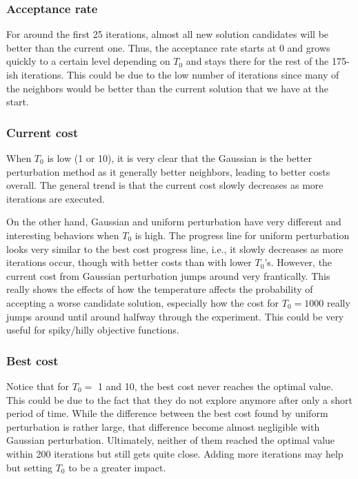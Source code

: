 \subsubsection*{Acceptance rate}

For around the first 25 iterations, almost all new solution candidates will be better than the current one. Thus, the acceptance rate starts at 0 and grows quickly to a certain level depending on \(T_0\) and stays there for the rest of the 175-ish iterations. This could be due to the low number of iterations since many of the neighbors would be better than the current solution that we have at the start.

\subsubsection*{Current cost}

When \(T_0\) is low (1 or 10), it is very clear that the Gaussian is the better perturbation method as it generally better neighbors, leading to better costs overall. The general trend is that the current cost slowly decreases as more iterations are executed.

On the other hand, Gaussian and uniform perturbation have very different and interesting behaviors when \(T_0\) is high. The progress line for uniform perturbation looks very similar to the best cost progress line, i.e., it slowly decreases as more iterations occur, though with better costs than with lower \(T_0\)'s. However, the current cost from Gaussian perturbation jumps around very frantically. This really shows the effects of how the temperature affects the probability of accepting a worse candidate solution, especially how the cost for \(T_0=1000\) really jumps around until around halfway through the experiment. This could be very useful for spiky/hilly objective functions.

\subsubsection*{Best cost}

Notice that for \(T_0 =\) 1 and 10, the best cost never reaches the optimal value. This could be due to the fact that they do not explore anymore after only a short period of time. While the difference between the best cost found by uniform perturbation is rather large, that difference become almost negligible with Gaussian perturbation. Ultimately, neither of them reached the optimal value within 200 iterations but still gets quite close. Adding more iterations may help but setting \(T_0\) to be a greater impact.


